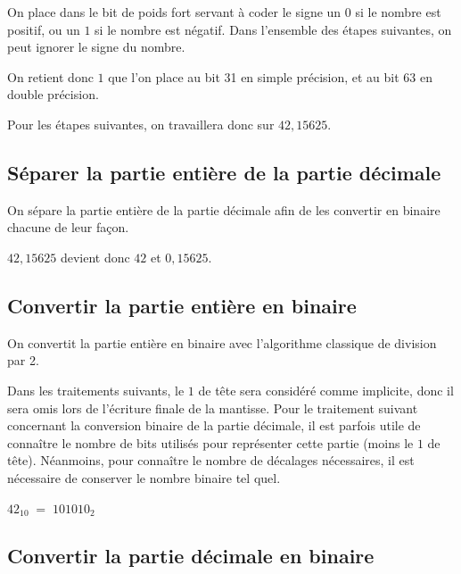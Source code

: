 \documentclass[11pt,a4paper]{article}
\begin{document}
On place dans le bit de poids fort servant à coder le signe un $ 0 $ si le nombre est positif, ou un $ 1 $ si le nombre est négatif.
Dans l'ensemble des étapes suivantes, on peut ignorer le signe du nombre.

\medskip

On retient donc $ 1 $ que l'on place au bit 31 en simple précision, et au bit 63 en double précision.

Pour les étapes suivantes, on travaillera donc sur $ 42,15625 $.

\bigskip

\subsection{Séparer la partie entière de la partie décimale}

\medskip

On sépare la partie entière de la partie décimale afin de les convertir en binaire chacune de leur façon.

\medskip

$ 42,15625 $ devient donc $ 42 $ et $ 0,15625 $.

\bigskip

\subsection{Convertir la partie entière en binaire}

\medskip

On convertit la partie entière en binaire avec l'algorithme classique de division par 2.

\medskip

Dans les traitements suivants, le $ 1 $ de tête sera considéré comme implicite, donc il sera omis lors de l'écriture finale de la mantisse.
Pour le traitement suivant concernant la conversion binaire de la partie décimale, il est parfois utile de connaître le nombre de bits utilisés pour représenter cette partie (moins le $ 1 $ de tête).
Néanmoins, pour connaître le nombre de décalages nécessaires, il est nécessaire de conserver le nombre binaire tel quel.

\medskip

$ 42_{10} \; = \; 101010_{2} $

\bigskip

\subsection{Convertir la partie décimale en binaire}
\end{document}
